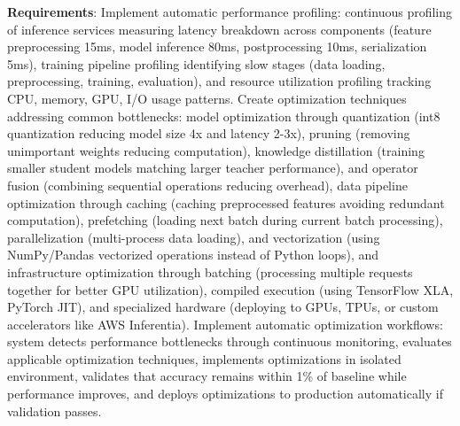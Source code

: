 \textbf{Requirements}: Implement automatic performance profiling: continuous profiling of inference services measuring latency breakdown across components (feature preprocessing 15ms, model inference 80ms, postprocessing 10ms, serialization 5ms), training pipeline profiling identifying slow stages (data loading, preprocessing, training, evaluation), and resource utilization profiling tracking CPU, memory, GPU, I/O usage patterns. Create optimization techniques addressing common bottlenecks: model optimization through quantization (int8 quantization reducing model size 4x and latency 2-3x), pruning (removing unimportant weights reducing computation), knowledge distillation (training smaller student models matching larger teacher performance), and operator fusion (combining sequential operations reducing overhead), data pipeline optimization through caching (caching preprocessed features avoiding redundant computation), prefetching (loading next batch during current batch processing), parallelization (multi-process data loading), and vectorization (using NumPy/Pandas vectorized operations instead of Python loops), and infrastructure optimization through batching (processing multiple requests together for better GPU utilization), compiled execution (using TensorFlow XLA, PyTorch JIT), and specialized hardware (deploying to GPUs, TPUs, or custom accelerators like AWS Inferentia). Implement automatic optimization workflows: system detects performance bottlenecks through continuous monitoring, evaluates applicable optimization techniques, implements optimizations in isolated environment, validates that accuracy remains within 1\% of baseline while performance improves, and deploys optimizations to production automatically if validation passes.

